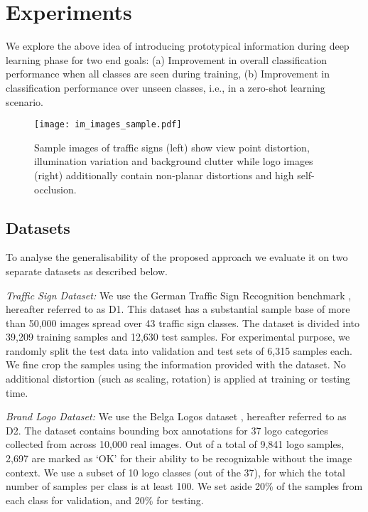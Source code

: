 \documentclass{bmvc2k}
\begin{document}
\section{\label{sec:Experiments}Experiments}
We explore the above idea of introducing prototypical information during deep learning phase for 
two end goals: (a) Improvement in overall classification performance when all classes are seen during 
training, (b) Improvement in classification performance over unseen classes,
i.e., in a zero-shot learning scenario.

\begin{figure}
  \centering
  \texttt{[image: im\_images\_sample.pdf]}
\caption{\label{fig:sampleimages}Sample images of traffic signs (left) show view
point distortion, illumination variation and background clutter while logo
images (right) additionally contain non-planar distortions and high
self-occlusion. }
\end{figure}\subsection{\label{}Datasets}
To analyse the generalisability of the proposed approach we evaluate it on two
separate datasets as described below.

\textit{Traffic Sign Dataset:} We use the German Traffic Sign Recognition
benchmark \cite{stallkamp2012manvscomp}, hereafter referred to as D1. This dataset has a substantial 
sample base of more than 50,000 images spread over 43 traffic sign classes. 
The dataset is divided into 39,209 training samples and 12,630 test samples. 
For experimental purpose, we randomly split the test data into validation and 
test sets of 6,315 samples each. We fine crop the samples using the information provided with the 
dataset. No additional distortion (such as scaling, rotation) is applied at training or testing time. 

\textit{Brand Logo Dataset:} We use the Belga Logos dataset
{\cite{belgajoly2009logo}}, hereafter referred to as D2.
The dataset contains bounding box annotations for 37 logo categories collected from across 10,000 
real images. Out of a total of 9,841 logo samples, 2,697 are marked as `OK' for their ability to be 
recognizable without the image context. We use a subset of 10 logo classes (out of the 37), for 
which the total number of samples per class is at least 100. We set aside 20\% of the samples from each class for validation, and 20\% for testing.
 
\end{document}
